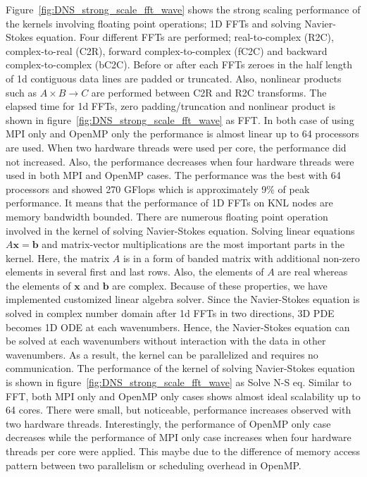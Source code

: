 Figure~\ref{fig:DNS_strong_scale_fft_wave} shows the strong scaling
performance of the kernels involving floating point operations; 1D FFTs
and solving Navier-Stokes equation. Four different FFTs are performed;
real-to-complex (R2C), complex-to-real (C2R), forward complex-to-complex
(fC2C) and backward complex-to-complex (bC2C). Before or after each FFTs
zeroes in the half length of 1d contiguous data lines are padded or
truncated. Also, nonlinear products such as $A\times B \rightarrow C$
are performed between C2R and R2C transforms. The elapsed time for 1d
FFTs, zero padding/truncation and nonlinear product is shown in
figure~\ref{fig:DNS_strong_scale_fft_wave} as FFT. In both case of using
MPI only and OpenMP only the performance is almost linear up to 64
processors are used. When two hardware threads were used per core, the
performance did not increased. Also, the performance decreases when four
hardware threads were used in both MPI and OpenMP cases. The performance
was the best with 64 processors and showed 270 GFlops which is
approximately 9\% of peak performance. It means that the performance of
1D FFTs on KNL nodes are memory bandwidth bounded. There are numerous
floating point operation involved in the kernel of solving Navier-Stokes
equation. Solving linear equations $A \textbf{x} = \textbf{b}$ and
matrix-vector multiplications are the most important parts in the
kernel. Here, the matrix $A$ is in a form of banded matrix with
additional non-zero elements in several first and last rows. Also, the
elements of $A$ are real whereas the elements of $\textbf{x}$ and
$\textbf{b}$ are complex. Because of these properties, we have
implemented customized linear algebra solver. Since the Navier-Stokes
equation is solved in complex number domain after 1d FFTs in two
directions, 3D PDE becomes 1D ODE at each wavenumbers. Hence, the
Navier-Stokes equation can be solved at each wavenumbers without
interaction with the data in other wavenumbers. As a result, the kernel
can be parallelized and requires no communication. The performance of
the kernel of solving Navier-Stokes equation is shown in
figure~\ref{fig:DNS_strong_scale_fft_wave} as Solve N-S eq. Similar to
FFT, both MPI only and OpenMP only cases shows almost ideal scalability
up to 64 cores. There were small, but noticeable, performance increases
observed with two hardware threads. Interestingly, the performance of
OpenMP only case decreases while the performance of MPI only case
increases when four hardware threads per core were applied. This maybe
due to the difference of memory access pattern between two parallelism
or scheduling overhead in OpenMP.           

